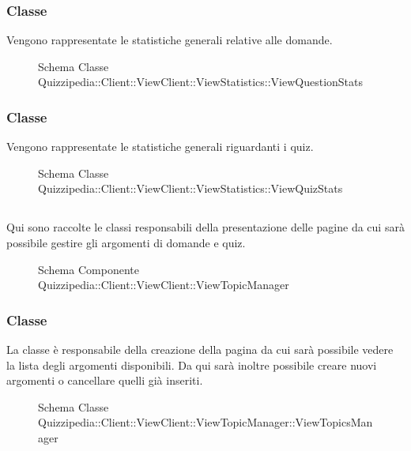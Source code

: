 \subsubsection{Classe }
Vengono rappresentate le statistiche generali relative alle domande.
\begin{figure}[H]
\centering
\noindent{}
\caption[Schema Classe ViewQuestionStats]{Schema Classe Quizzipedia::Client::ViewClient::ViewStatistics::ViewQuestionStats}
\end{figure}
\subsubsection{Classe }
Vengono rappresentate le statistiche generali riguardanti i quiz.
\begin{figure}[H]
\centering
\noindent{}
\caption[Schema Classe ViewQuizStats]{Schema Classe Quizzipedia::Client::ViewClient::ViewStatistics::ViewQuizStats}
\end{figure}
\subsection{}
Qui sono raccolte le classi responsabili della presentazione delle pagine da cui sarà possibile gestire gli argomenti di domande e quiz.
\begin{figure}[H]
\centering
\noindent{}
\caption[Schema Componente Quizzipedia::Client::ViewClient::ViewTopicManager]{Schema Componente Quizzipedia::Client::ViewClient::ViewTopicManager}
\end{figure}
\subsubsection{Classe }
La classe è responsabile della creazione della pagina da cui sarà possibile vedere la lista degli argomenti disponibili. Da qui sarà inoltre possibile creare nuovi argomenti o cancellare quelli già inseriti.
\begin{figure}[H]
\centering
\noindent{}
\caption[Schema Classe ViewTopicsManager]{Schema Classe Quizzipedia::Client::ViewClient::ViewTopicManager::ViewTopicsManager}
\end{figure}
